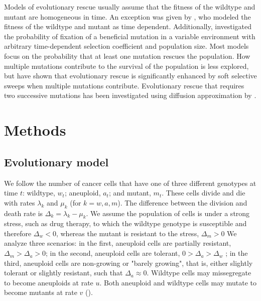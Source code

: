 \documentclass[12pt]{extarticle}
\begin{document}
Models of evolutionary rescue usually assume that the fitness of the wildtype and mutant are homogeneous in time. An exception was given by \citet{marrec2020adapt}, who modeled the fitness of the wildtype and mutant as time dependent. Additionally, \citet{uecker2011fixation} investigated the probability of fixation of a beneficial mutation in a variable environment with arbitrary time-dependent selection coefficient and population size.
Most models focus on the probability that at least one mutation rescues the population. How multiple mutations contribute to the survival of the population is less explored, but \citet{wilson2017soft} have shown that evolutionary rescue is significantly enhanced by soft selective sweeps when multiple mutations contribute. 
Evolutionary rescue that requires two successive mutations has been investigated using diffusion approximation by \citet{martin2013probability}.


\section*{Methods}
\subsection*{Evolutionary model}

We follow the number of cancer cells that have one of three different genotypes at time $t$: wildtype, $w_t$; aneuploid, $a_t$; and mutant, $m_t$. 
These cells divide and die with rates $\lambda_k$ and $\mu_k$ (for $k=w, a, m$).
The difference between the division and death rate is $\Delta_k = \lambda_k-\mu_k$.
We assume the population of cells is under a strong stress, such as drug therapy, to which the wildtype genotype is susceptible and therefore $\Delta_w<0$, whereas the mutant is resistant to the stress, $\Delta_m>0$
We analyze three scenarios: in the first, aneuploid cells are partially resistant, $\Delta_m>\Delta_a>0$; in the second, aneuploid cells are tolerant, $0>\Delta_a>\Delta_w$ \citep[see][for the distinction between susceptible, resistant, and tolerant]{brauner2016distinguishing}; in the third, aneuploid cells are non-growing or "barely growing", that is, either slightly tolerant or slightly resistant, such that $\Delta_a \approx 0$.
Wildtype cells may missegregate to become aneuploids at rate $u$. Both aneuploid and wildtype cells may mutate to become mutants at rate $v$ (). 
\end{document}
